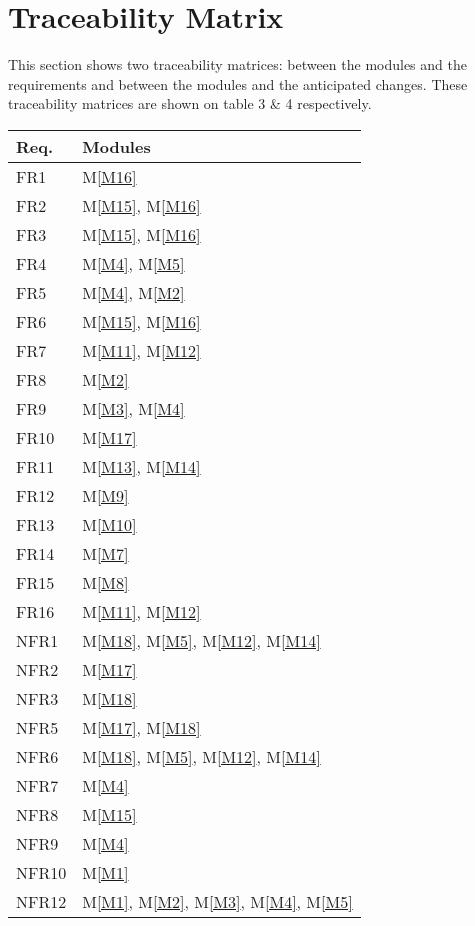 \documentclass[12pt, titlepage]{article}
\newcommand{\mref}[1]{M\ref{#1}}
\begin{document}
\section{Traceability Matrix} \label{SecTM}

This section shows two traceability matrices: between the modules and the requirements and between the modules and the anticipated changes. These traceability matrices are shown on table 3 \& 4 respectively.

\begin{table}[htbp]
\centering
\begin{tabular}{p{} p{}}
\toprule
\textbf{Req.} & \textbf{Modules}\\
\midrule
FR1 & \mref{M16}\\
FR2 & \mref{M15}, \mref{M16}\\
FR3 & \mref{M15}, \mref{M16}\\
FR4 & \mref{M4}, \mref{M5}\\
FR5 & \mref{M4}, \mref{M2}\\
FR6 & \mref{M15}, \mref{M16}\\
FR7 & \mref{M11}, \mref{M12}\\
FR8 & \mref{M2}\\
FR9 & \mref{M3}, \mref{M4}\\
FR10 & \mref{M17}\\
FR11 & \mref{M13}, \mref{M14}\\
FR12 & \mref{M9}\\
FR13 & \mref{M10}\\
FR14 & \mref{M7}\\
FR15 & \mref{M8}\\
FR16 & \mref{M11}, \mref{M12}\\
NFR1 & \mref{M18}, \mref{M5}, \mref{M12}, \mref{M14}\\
NFR2 & \mref{M17}\\
NFR3 & \mref{M18}\\
NFR5 & \mref{M17}, \mref{M18}\\
NFR6 & \mref{M18}, \mref{M5}, \mref{M12}, \mref{M14}\\
NFR7 & \mref{M4}\\
NFR8 & \mref{M15}\\
NFR9 & \mref{M4}\\
NFR10 & \mref{M1}\\
NFR12 & \mref{M1}, \mref{M2}, \mref{M3}, \mref{M4}, \mref{M5}\\

\end{tabular}
\end{table}
\end{document}
